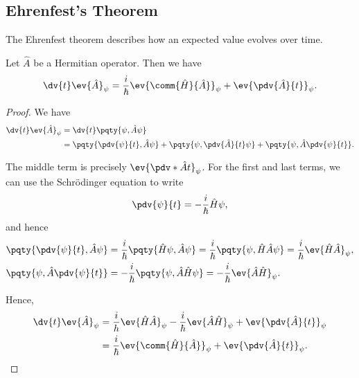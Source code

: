 \subsection{Ehrenfest's Theorem}

The Ehrenfest theorem describes how an expected value evolves over time.

\begin{theorem}
    Let \(\hat{A}\) be a Hermitian operator. Then we have
    \begin{equation}
        \dv{t} \ev{\hat{A}}_\psi = \frac{i}{\hbar} \ev{\comm{\hat{H}}{\hat{A}}}_\psi + \ev{\pdv{\hat{A}}{t}}_\psi.
    \end{equation}
\end{theorem}

\begin{proof}
    We have
    \begin{subequations}
        \begin{align}
            \dv{t} \ev{\hat{A}}_\psi &= \dv{t} \pqty{\psi, \hat{A} \psi} \\
            &= \pqty{\pdv{\psi}{t}, \hat{A} \psi} + \pqty{\psi, \pdv{\hat{A}}{t} \psi} + \pqty{\psi, \hat{A} \pdv{\psi}{t}}.
        \end{align}
    \end{subequations}

    The middle term is precisely \(\ev{\pdv*{\hat{A}}{t}}_\psi\). For the first and last terms, we can use the Schrödinger equation to write
    \begin{equation}
        \pdv{\psi}{t} = - \frac{i}{\hbar} \hat{H} \psi,
    \end{equation}
    and hence
    \begin{subequations}
        \begin{align}
            \pqty{\pdv{\psi}{t}, \hat{A} \psi} &= \frac{i}{\hbar} \pqty{\hat{H} \psi, \hat{A} \psi} = \frac{i}{\hbar} \pqty{\psi, \hat{H} \hat{A} \psi} = \frac{i}{\hbar} \ev{\hat{H} \hat{A}}_\psi, \\
            \pqty{\psi, \hat{A} \pdv{\psi}{t}} &= - \frac{i}{\hbar} \pqty{\psi, \hat{A} \hat{H} \psi} = - \frac{i}{\hbar} \ev{\hat{A} \hat{H}}_\psi.
        \end{align}
    \end{subequations}

    Hence,
    \begin{subequations}
        \begin{align}
            \dv{t} \ev{\hat{A}}_\psi &= \frac{i}{h} \ev{\hat{H} \hat{A}}_\psi - \frac{i}{\hbar} \ev{\hat{A} \hat{H}}_\psi + \ev{\pdv{\hat{A}}{t}}_\psi \\
            &= \frac{i}{\hbar} \ev{\comm{\hat{H}}{\hat{A}}}_\psi + \ev{\pdv{\hat{A}}{t}}_\psi.
        \end{align}
    \end{subequations}
\end{proof}

